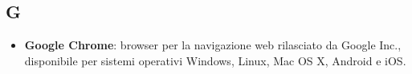 \subsection{G}
\begin{itemize} 

\item \textbf{Google Chrome}: browser per la navigazione web rilasciato da Google Inc., disponibile per sistemi operativi Windows, Linux, Mac OS X, Android e iOS.

\end{itemize}